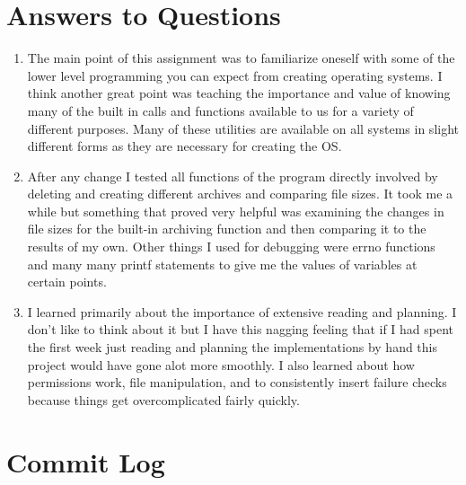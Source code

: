 \documentclass[letterpaper,10pt]{article}
\begin{document}
\section{Answers to Questions}
\begin{enumerate}
    \item
	The main point of this assignment was to familiarize oneself with some of the lower level programming you can expect from creating operating systems. I think another great point was teaching the importance and value
of knowing many of the built in calls and functions available to us for a variety of different purposes. Many of these utilities are available on all systems in slight different forms as they are necessary for creating the OS.
	\item 
	After any change I tested all functions of the program directly involved by deleting and creating different archives and comparing file sizes. It took me a while but something that proved very helpful was examining the changes in file sizes
for the built-in archiving function and then comparing it to the results of my own. Other things I used for debugging were errno functions and many many printf statements to give me the values of variables at certain points.
	\item
	I learned primarily about the importance of extensive reading and planning. I don't like to think about it but I have this nagging feeling that if I had spent the first week just reading and planning the implementations by hand
this project would have gone alot more smoothly. I also learned about how permissions work, file manipulation, and to consistently insert failure checks because things get overcomplicated fairly quickly.	
    
\end{enumerate}

\section{Commit Log}


\end{document}
